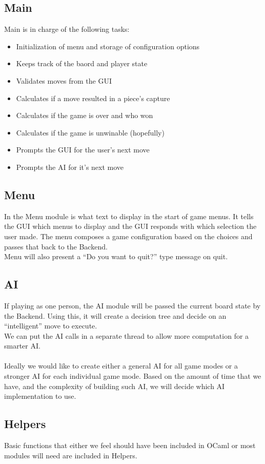 \documentclass[11pt, oneside]{article}
\begin{document}
\subsection{Main}
Main is in charge of the following tasks:
\begin{itemize}
\item Initialization of menu and storage of configuration options
\item Keeps track of the baord and player state
\item Validates moves from the GUI
\item Calculates if a move resulted in a piece's capture
\item Calculates if the game is over and who won
\item Calculates if the game is unwinable (hopefully)
\item Prompts the GUI for the user's next move
\item Prompts the AI for it's next move
\end{itemize}

\subsection{Menu}
In the Menu module is what text to display in the start of game menus. It tells
the GUI which menus to display and the GUI responds with which selection the
user made. The menu composes a game configuration based on the choices and
passes that back to the Backend.\\
Menu will also present a ``Do you want to quit?'' type message on quit.

\subsection{AI}
If playing as one person, the AI module will be passed the current board state
by the Backend. Using this, it will create a decision tree and decide on an
``intelligent'' move
to execute.\\
We can put the AI calls in a separate thread to allow more computation for a
smarter AI.\\\\
Ideally we would like to create either a general AI for all game modes or a
stronger AI for each individual game mode. Based on the amount of time that we
have, and the complexity of building such AI, we will decide which AI
implementation to use.

\subsection{Helpers}
Basic functions that either we feel should have been included in OCaml or most
modules will need are included in Helpers.
\end{document}
